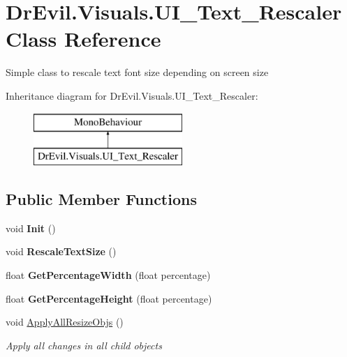\hypertarget{class_dr_evil_1_1_visuals_1_1_u_i___text___rescaler}{}\section{Dr\+Evil.\+Visuals.\+U\+I\+\_\+\+Text\+\_\+\+Rescaler Class Reference}
\label{class_dr_evil_1_1_visuals_1_1_u_i___text___rescaler}


Simple class to rescale text font size depending on screen size  


Inheritance diagram for Dr\+Evil.\+Visuals.\+U\+I\+\_\+\+Text\+\_\+\+Rescaler\+:\begin{figure}[H]
\begin{center}
\leavevmode
\includegraphics[height=2.000000cm]{class_dr_evil_1_1_visuals_1_1_u_i___text___rescaler}
\end{center}
\end{figure}
\subsection*{Public Member Functions}
\begin{DoxyCompactItemize}
\item 
\mbox{\label{class_dr_evil_1_1_visuals_1_1_u_i___text___rescaler_a611b78cc6febe907045caa567a3d045e}} 
void {\bfseries Init} ()
\item 
\mbox{\label{class_dr_evil_1_1_visuals_1_1_u_i___text___rescaler_ae22dbe89329ef5e26afe6c7d0ded92d8}} 
void {\bfseries Rescale\+Text\+Size} ()
\item 
\mbox{\label{class_dr_evil_1_1_visuals_1_1_u_i___text___rescaler_a1b2199ad3c933760ec0a522bb9f1bfd0}} 
float {\bfseries Get\+Percentage\+Width} (float percentage)
\item 
\mbox{\label{class_dr_evil_1_1_visuals_1_1_u_i___text___rescaler_ae6be95219435cd2147e5a2126e5a2cd8}} 
float {\bfseries Get\+Percentage\+Height} (float percentage)
\item 
void \mbox{\hyperlink{class_dr_evil_1_1_visuals_1_1_u_i___text___rescaler_a28595219a5b1654f56d4ad4b5a9ef663}{Apply\+All\+Resize\+Objs}} ()
\begin{DoxyCompactList}\small\item\em Apply all changes in all child objects \end{DoxyCompactList}\end{DoxyCompactItemize}
